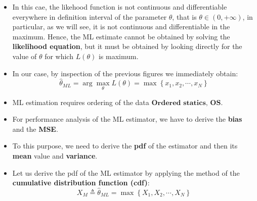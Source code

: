 \begin{itemize}
\begin{itemize}
\[
=
\begin{cases}
1/\theta^N, & 0 \leq \max\{x_1, x_2, \dots, x_N\} \leq \theta \\
0, & \textit{otherwise}
\end{cases}
\]

\[
\max\{x_i\} \triangleq \max\{x_1, x_2, \cdots, x_N\}
\]
    \item In this cae, the likehood function is not continuous and differentiable everywhere in definition interval of the parameter \(\theta\), that is \(\theta\in(0,+\infty)\), in particular, as we will see, it is not continuous and differentiable in the maximum. Hence, the ML estimate cannot be obtained by solving the \textbf{likelihood equation}, but it must be obtained by looking directly for the value of \(\theta\) for which \(L(\theta)\) is maximum.
    \item In our case, by inspection of the previous figures we immediately obtain:
$$
\hat{\theta}_{ML} = \arg\max_{\theta} L(\theta) = \max \left\{ x_1, x_2, \cdots, x_N \right\}
$$

    \item ML estimation requires ordering of the data \(\textbf{Ordered statics, OS}\).
    \item For performance analysis of the ML estimator, we have to derive the \textbf{bias} and the \textbf{MSE}.
    \item To this purpose, we need to derive the \textbf{pdf} of the estimator and then its \textbf{mean} value and \textbf{variance}.
    \item Let us derive the pdf of the ML estimator by applying the method of the \textbf{cumulative distribution function (cdf)}:
    $$
    X_M \triangleq \hat{\theta}_{ML} = \max \left\{ X_1, X_2, \cdots, X_N \right\}
    $$


\end{itemize}
\end{itemize}
